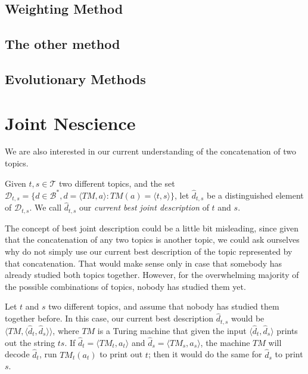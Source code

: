 
\subsection{Weighting Method}


\subsection{The other method}


\subsection{Evolutionary Methods}


%
%

\section{Joint Nescience}

We are also interested in our current understanding of the concatenation of two topics.

\begin{definition}
Given $t,s \in \mathcal{T}$ two different topics, and the set $\mathcal{D}_{t,s} = \{ d \in \mathcal{B}^\ast, d = \langle TM,a \rangle : TM(a) = \langle t,s \rangle \}$, let $\hat{d}_{t,s}$ be a distinguished element of $\mathcal{D}_{t,s}$. We call $\hat{d}_{t,s}$ our \emph{current best joint description} of $t$ and $s$.
\end{definition}

The concept of best joint description could be a little bit misleading, since given that the concatenation of any two topics is another topic, we could ask ourselves why do not simply use our current best description of the topic represented by that concatenation. That would make sense only in case that somebody has already studied both topics together. However, for the overwhelming majority of the possible combinations of topics, nobody has studied them yet.

\begin{example}
\label{ex:unknown_join}
Let $t$ and $s$ two different topics, and assume that nobody has studied them together before. In this case, our current best description $\hat{d}_{t, s}$ would be $\langle TM, \langle \hat{d}_t, \hat{d}_s \rangle \rangle$, where $TM$ is a Turing machine that given the input $\langle \hat{d}_t, \hat{d}_s \rangle$ prints out the string $ts$. If $\hat{d}_t = \langle TM_t, a_t \rangle$ and $\hat{d}_s = \langle TM_s, a_s \rangle$, the machine $TM$ will decode $\hat{d}_t$, run $TM_t(a_t)$ to print out $t$; then it would do the same for $\hat{d}_s$ to print $s$.
\end{example}

